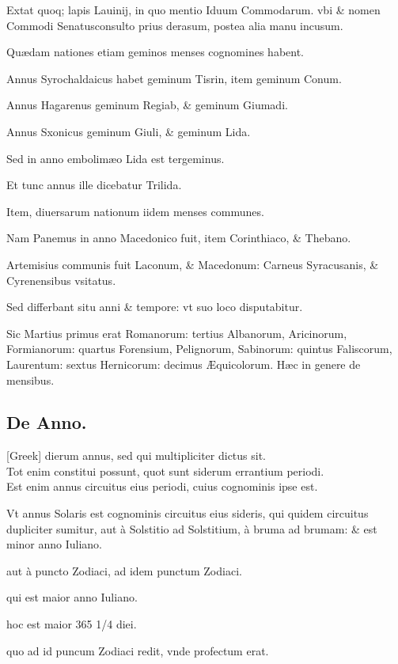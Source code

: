 Extat
quoq; lapis Lauinij, in quo mentio
Iduum Commodarum. vbi \&
nomen  Commodi Senatusconsulto prius derasum, postea alia manu
incusum.

 Quædam nationes etiam geminos menses cognomines habent.

Annus Syrochaldaicus habet geminum Tisrin, item geminum Conum.

Annus Hagarenus geminum Regiab, \& geminum Giumadi.

Annus Sxonicus geminum Giuli, \& geminum Lida.

Sed in
anno embolimæo Lida est tergeminus.

Et tunc annus ille dicebatur
Trilida.

Item, diuersarum nationum iidem menses communes.

Nam
Panemus in anno Macedonico fuit, item Corinthiaco, \& Thebano.

Artemisius communis fuit Laconum, \& Macedonum: Carneus Syracusanis,
\& Cyrenensibus vsitatus.

Sed differbant situ anni \& tempore:
vt suo loco disputabitur.

Sic Martius primus erat  Romanorum:
tertius Albanorum, Aricinorum, Formianorum: quartus Forensium,
Pelignorum, Sabinorum: quintus Faliscorum, Laurentum:
sextus Hernicorum: decimus Æquicolorum. Hæc in genere
de mensibus.



\subsection{De Anno.}
\setcounter{parcount}{0}


 \textgreek{[Greek]}
 dierum annus, sed qui multipliciter dictus
sit. \\ \p
Tot enim constitui possunt, quot sunt siderum errantium
periodi.\\ \p
Est enim annus circuitus eius periodi, cuius cognominis
ipse est.

Vt annus Solaris est cognominis circuitus eius  sideris,
qui quidem circuitus dupliciter sumitur, aut à Solstitio ad Solstitium,
à bruma ad brumam: \& est minor anno Iuliano.

aut à puncto Zodiaci,
ad idem punctum Zodiaci.

qui est maior anno Iuliano.

hoc est maior 365 1/4 diei.

quo ad id puncum Zodiaci redit, vnde profectum
erat.

